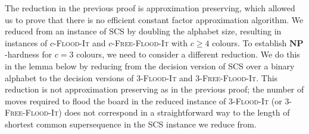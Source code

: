 \documentclass[a4paper,11pt]{llncs}
\newcounter{l}
\renewcommand{\geq}{\geqslant}
\newcommand{\NPtime}{\ensuremath{\mathbf{NP}}}
\newcommand{\Coloroid}[1]{$#1$-\textsc{Flood-It}}
\newcommand{\ColoroidFree}[1]{$#1$-\textsc{Free-Flood-It}}
\newcommand{\SCS}{\textsc{SCS}}
\begin{document}
The reduction in the previous proof is approximation preserving, which allowed us to prove that there is no efficient constant factor approximation algorithm. We reduced from an instance of \SCS{} by doubling the alphabet size, resulting in instances of \Coloroid{c} and \ColoroidFree{c} with $c\geq 4$ colours. To establish \NPtime-hardness for $c=3$ colours, we need to consider a different reduction. We do this in the lemma below by reducing from the decision version of \SCS{} over a binary alphabet to the decision versions of \Coloroid{3} and \ColoroidFree{3}. This reduction is not approximation preserving as in the previous proof; the number of moves required to flood the board in the reduced instance of \Coloroid{3} (or \ColoroidFree{3}) does not correspond in a straightforward way to the length of shortest common supersequence in the \SCS{} instance we reduce from.
\end{document}
